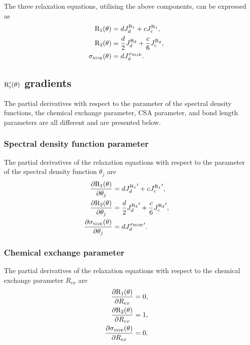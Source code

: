 The three relaxation equations, utilising the above components, can be expressed as
\begin{align}
    \mathrm{R}_1(\theta) & = d J_d^{\mathrm{R}_1} + c J_c^{\mathrm{R}_1},                          \label{eq: Ri': R1} \\
    \mathrm{R}_2(\theta) & = \frac{d}{2} J_d^{\mathrm{R}_2} + \frac{c}{6} J_c^{\mathrm{R}_2},      \label{eq: Ri': R2} \\
    \sigma_{\scriptscriptstyle \mathrm{NOE}}(\theta) & = d J_d^{\sigma_{\scriptscriptstyle \mathrm{NOE}}}.                          \label{eq: Ri': sigmaNOE}
\end{align}




\subsection{$\mathrm{R}_i'(\theta)$ gradients}

The partial derivatives with respect to the parameter of the spectral density functions, the chemical exchange parameter, CSA parameter, and bond length parameters are all different and are presented below.


\subsubsection{Spectral density function parameter}

The partial derivatives of the relaxation equations with respect to the parameter of the spectral density function $\theta_j$ are
\begin{align}
    \frac{\partial \mathrm{R}_1(\theta)}{\partial \theta_j} &= d {J_d^{\mathrm{R}_1}}' + c {J_c^{\mathrm{R}_1}}',                      \label{eq: Ri': dR1/dmf} \\
    \frac{\partial \mathrm{R}_2(\theta)}{\partial \theta_j} &= \frac{d}{2} {J_d^{\mathrm{R}_2}}' + \frac{c}{6} {J_c^{\mathrm{R}_2}}',  \label{eq: Ri': dR2/dmf} \\
    \frac{\partial \sigma_{\scriptscriptstyle \mathrm{NOE}}(\theta)}{\partial \theta_j} &= d {J_d^{\sigma_{\scriptscriptstyle \mathrm{NOE}}}}'.                         \label{eq: Ri': dsigmaNOE/dmf}
\end{align}


\subsubsection{Chemical exchange parameter}

The partial derivatives of the relaxation equations with respect to the chemical exchange parameter $R_{ex}$ are
\begin{align}
    \frac{\partial \mathrm{R}_1(\theta)}{\partial R_{ex}} &= 0,          \label{eq: Ri': dR1/dRex} \\
    \frac{\partial \mathrm{R}_2(\theta)}{\partial R_{ex}} &= 1,          \label{eq: Ri': dR2/dRex} \\
    \frac{\partial \sigma_{\scriptscriptstyle \mathrm{NOE}}(\theta)}{\partial R_{ex}} &= 0.   \label{eq: Ri': dsigmaNOE/dRex}
\end{align}


